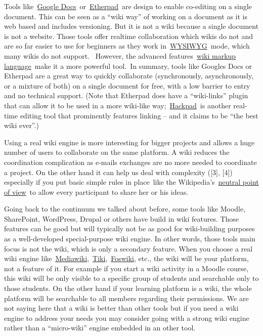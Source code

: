 Tools like~\href{https://docs.google.com/}{Google
Docs}~or~\href{http://en.wikipedia.org/wiki/Etherpad}{Etherpad}~are
design to enable co-editing on a single document. This can be seen as a
``wiki way'' of working on a document as it is web based and includes
versioning. But it is not a wiki because a single document is not a
website. Those tools offer realtime collaboration which wikis do not and
are so far easier to use for beginners as they work
in~\href{http://en.wikipedia.org/wiki/WYSIWYG}{WYSIWYG}~mode, which many
wikis do not support. ~However, the advanced
features~\href{http://en.wikipedia.org/wiki/Wiki_syntax}{wiki markup
language}~make it a more powerful tool.~In summary, tools like Googles
Docs or Etherpad are a great way to quickly collaborate (synchronously,
asynchronously, or a mixture of both) on a single document for free,
with a low barrier to entry and no technical support. (Note that
Etherpad does have a ``wiki-links'' plugin that can allow it to be used
in a more wiki-like way;~\href{https://hackpad.com/}{Hackpad}~is another
real-time editing tool that prominently features linking -- and it
claims to be ``the best wiki ever''.)

Using a real wiki engine is more interesting for bigger projects and
allows a huge number of users to collaborate on the same platform. A
wiki reduces the coordination complication as e-mails exchanges are no
more needed to coordinate a project. On the other hand it can help us
deal with complexity ({[}3{]}, {[}4{]}) especially if you put basic
simple rules in place~like the
Wikipedia's~\href{http://en.wikipedia.org/wiki/NPOV}{neutral point of
view}~to allow every participant to share her or his ideas.

Going back to the continuum we talked about before, some tools like
Moodle, SharePoint, WordPress, Drupal or others have build in wiki
features. Those features can be good but will typically not be as good
for wiki-building purposes as a well-developed special-purpose wiki
engine. In other words, those tools main focus is not the wiki, which is
only a secondary feature. When you choose a real wiki engine
like~\href{http://www.mediawiki.org/}{Mediawiki},~\href{http://www.tiki.org/}{Tiki},~\href{http://foswiki.org/}{Foswiki},
etc., the wiki will be your platform, not a feature of it. For example
if you start a wiki activity in a Moodle course, this wiki will be only
visible to a specific group of students and searchable only to those
students. On the other hand if your learning platform is a wiki, the
whole platform will be searchable to all members regarding their
permissions. We are not saying here that a wiki is better than other
tools but if you need a wiki engine to address your needs you may
consider going with a strong wiki engine rather than a ``micro-wiki''
engine embedded in an other tool.

